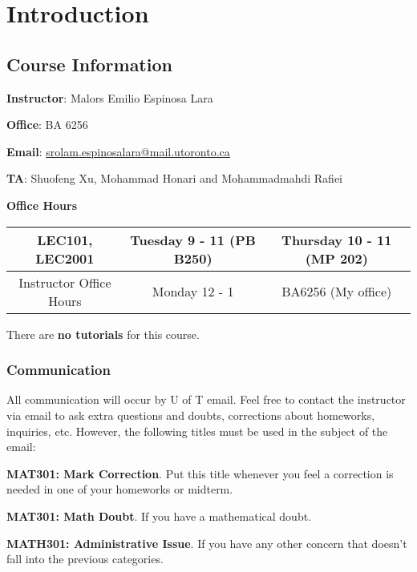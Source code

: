 \chapter{Introduction}

\section{Course Information}

\begin{listu}
    \item \textbf{Instructor}: Malors Emilio Espinosa Lara
    \item \textbf{Office}: BA 6256
    \item \textbf{Email}: \href{mailto:srolam.espinosalara@mail.utoronto.ca}{srolam.espinosalara@mail.utoronto.ca}
    \item \textbf{TA}: Shuofeng Xu, Mohammad Honari and Mohammadmahdi Rafiei
    \item \textbf{Office Hours}
    \begin{table}[ht!]
        \centering
        \begin{tabular}{|c|c|c|}
            \hline
            LEC101, LEC2001 & Tuesday 9 - 11 (PB B250) & Thursday 10 - 11 (MP 202) \\
            \hline
            Instructor Office Hours & Monday 12 - 1 & BA6256 (My office) \\
            \hline
        \end{tabular}
    \end{table}
    \item There are \textbf{no tutorials} for this course.
\end{listu}

\subsection{Communication}

All communication will occur by U of T email. Feel free to contact the instructor via email to ask extra questions and doubts, corrections about homeworks, inquiries, etc. However, the following titles must be used in the subject of the email:

\begin{listu}
    \item \textbf{MAT301: Mark Correction}. Put this title whenever you feel a correction is needed in one of your homeworks or midterm.
    \item \textbf{MAT301: Math Doubt}. If you have a mathematical doubt.
    \item \textbf{MATH301: Administrative Issue}. If you have any other concern that doesn’t fall into the previous categories.
\end{listu}

